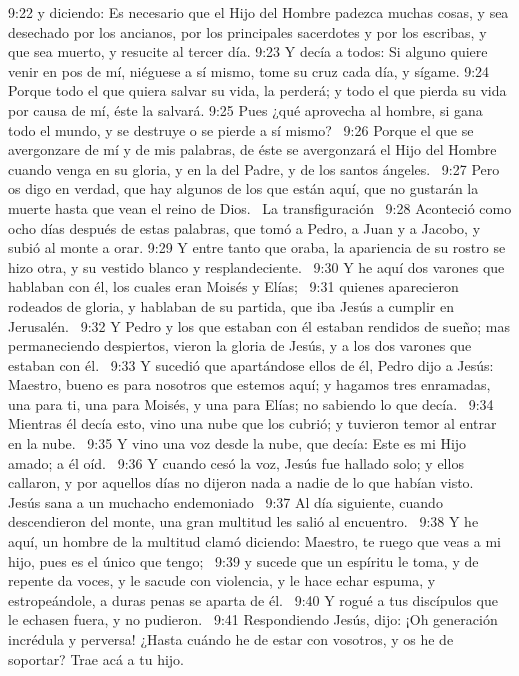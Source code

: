 9:22 y diciendo: Es necesario que el Hijo del Hombre padezca muchas cosas, y sea desechado por los ancianos, por los principales sacerdotes y por los escribas, y que sea muerto, y resucite al tercer día. 
9:23 Y decía a todos: Si alguno quiere venir en pos de mí, niéguese a sí mismo, tome su cruz cada día, y sígame. 
9:24 Porque todo el que quiera salvar su vida, la perderá; y todo el que pierda su vida por causa de mí, éste la salvará. 
9:25 Pues ¿qué aprovecha al hombre, si gana todo el mundo, y se destruye o se pierde a sí mismo?  
9:26 Porque el que se avergonzare de mí y de mis palabras, de éste se avergonzará el Hijo del Hombre cuando venga en su gloria, y en la del Padre, y de los santos ángeles.  
9:27 Pero os digo en verdad, que hay algunos de los que están aquí, que no gustarán la muerte hasta que vean el reino de Dios.  
La transfiguración   
9:28 Aconteció como ocho días después de estas palabras, que tomó a Pedro, a Juan y a Jacobo, y subió al monte a orar. 
9:29 Y entre tanto que oraba, la apariencia de su rostro se hizo otra, y su vestido blanco y resplandeciente.  
9:30 Y he aquí dos varones que hablaban con él, los cuales eran Moisés y Elías;  
9:31 quienes aparecieron rodeados de gloria, y hablaban de su partida, que iba Jesús a cumplir en Jerusalén.  
9:32 Y Pedro y los que estaban con él estaban rendidos de sueño; mas permaneciendo despiertos, vieron la gloria de Jesús, y a los dos varones que estaban con él.  
9:33 Y sucedió que apartándose ellos de él, Pedro dijo a Jesús: Maestro, bueno es para nosotros que estemos aquí; y hagamos tres enramadas, una para ti, una para Moisés, y una para Elías; no sabiendo lo que decía.  
9:34 Mientras él decía esto, vino una nube que los cubrió; y tuvieron temor al entrar en la nube.  
9:35 Y vino una voz desde la nube, que decía: Este es mi Hijo amado; a él oíd.  
9:36 Y cuando cesó la voz, Jesús fue hallado solo; y ellos callaron, y por aquellos días no dijeron nada a nadie de lo que habían visto.  
Jesús sana a un muchacho endemoniado   
9:37 Al día siguiente, cuando descendieron del monte, una gran multitud les salió al encuentro.  
9:38 Y he aquí, un hombre de la multitud clamó diciendo: Maestro, te ruego que veas a mi hijo, pues es el único que tengo;  
9:39 y sucede que un espíritu le toma, y de repente da voces, y le sacude con violencia, y le hace echar espuma, y estropeándole, a duras penas se aparta de él.  
9:40 Y rogué a tus discípulos que le echasen fuera, y no pudieron.  
9:41 Respondiendo Jesús, dijo: ¡Oh generación incrédula y perversa! ¿Hasta cuándo he de estar con vosotros, y os he de soportar? Trae acá a tu hijo. 

